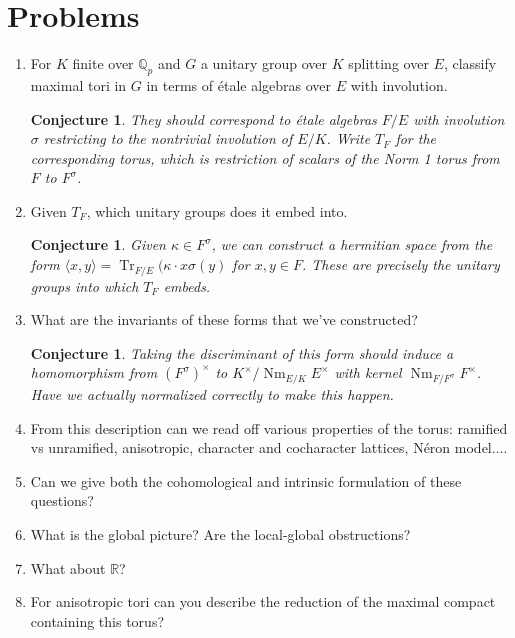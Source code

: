 \documentclass{article}
\theoremstyle{plain}
\newtheorem{conjecture}[theorem]{Conjecture}
\theoremstyle{definition}
\DeclareMathOperator{\Nm}{Nm}
\DeclareMathOperator{\Tr}{Tr}
\newcommand{\RR}{\mathbb{R}}
\newcommand{\Qp}{\mathbb{Q}_p}
\newcommand{\la}{\langle}
\newcommand{\ra}{\rangle}
\begin{document}
\section{Problems}

\begin{enumerate}

\item For $K$ finite over $\Qp$ and $G$ a unitary group over $K$ splitting over $E$, classify maximal tori in $G$ in terms of \'etale algebras over $E$ with involution.

\begin{conjecture}
They should correspond to \'etale algebras $F / E$ with involution $\sigma$ restricting to the nontrivial involution of $E / K$.  Write $T_F$ for the corresponding torus, which is restriction of scalars of the Norm 1 torus from $F$ to $F^\sigma$.
\end{conjecture}
\item Given $T_F$, which unitary groups does it embed into.

\begin{conjecture}
Given $\kappa \in F^\sigma$, we can construct a hermitian space from the form $\la x, y \ra = \Tr_{F/E}(\kappa \cdot x \sigma(y)$ for $x, y \in F$.  These are precisely the unitary groups into which $T_F$ embeds.
\end{conjecture}

\item What are the invariants of these forms that we've constructed?

\begin{conjecture}
Taking the discriminant of this form should induce a homomorphism from $(F^\sigma)^\times$ to $K^\times / \Nm_{E/K} E^\times$ with kernel $\Nm_{F/F^\sigma} F^\times$.  Have we actually normalized correctly to make this happen.
\end{conjecture}

\item From this description can we read off various properties of the torus: ramified vs unramified, anisotropic, character and cocharacter lattices, N\'eron model....

\item Can we give both the cohomological and intrinsic formulation of these questions?

\item What is the global picture?  Are the local-global obstructions?

\item What about $\RR$?

\item For anisotropic tori can you describe the reduction of the maximal compact containing this torus?

\end{enumerate}
\end{document}
